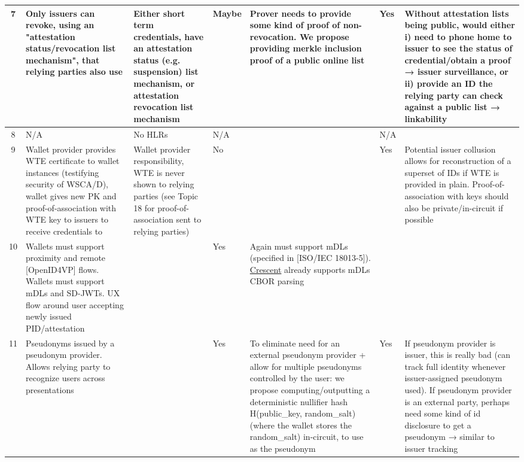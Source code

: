 \begin{longtable}{|c|p{}|p{}|p{}|p{}|p{}|p{}|}
7 & Only issuers can revoke, using an "attestation status/revocation list mechanism", that relying parties also use & Either short term credentials, have an attestation status (e.g. suspension) list mechanism, or attestation revocation list mechanism & Maybe & Prover needs to provide some kind of proof of non-revocation. We propose providing merkle inclusion proof of a public online list & Yes & Without attestation lists being public, would either i) need to phone home to issuer to see the status of credential/obtain a proof → issuer surveillance, or ii) provide an ID the relying party can check against a public list → linkability \\
\hline

8 & N/A & No HLRs & N/A & & N/A & \\
\hline

9 & Wallet provider provides WTE certificate to wallet instances (testifying security of WSCA/D), wallet gives new PK and proof-of-association with WTE key to issuers to receive credentials to & Wallet provider responsibility, WTE is never shown to relying parties (see Topic 18 for proof-of-association sent to relying parties) & No & & Yes & Potential issuer collusion allows for reconstruction of a superset of IDs if WTE is provided in plain. Proof-of-association with keys should also be private/in-circuit if possible \\
\hline

10 & Wallets must support proximity and remote [OpenID4VP] flows. Wallets must support mDLs and SD-JWTs. UX flow around user accepting newly issued PID/attestation & & Yes & Again must support mDLs (specified in [ISO/IEC 18013-5]). \href{https://github.com/microsoft/crescent-credentials}{Crescent} already supports mDLs CBOR parsing & & \\
\hline

11 & Pseudonyms issued by a pseudonym provider. Allows relying party to recognize users across presentations & & Yes & To eliminate need for an external pseudonym provider + allow for multiple pseudonyms controlled by the user: we propose computing/outputting a deterministic nullifier hash H(public\_key, random\_salt) (where the wallet stores the random\_salt) in-circuit, to use as the pseudonym & Yes & If pseudonym provider is issuer, this is really bad (can track full identity whenever issuer-assigned pseudonym used). If pseudonym provider is an external party, perhaps need some kind of id disclosure to get a pseudonym → similar to issuer tracking \\
\hline


\end{longtable}
